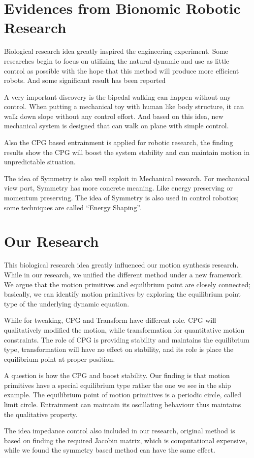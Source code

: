 \section{ Evidences from Bionomic Robotic Research}
Biological research idea greatly inspired the engineering experiment.
Some researches begin to focus on utilizing the natural dynamic and use as little control as possible with the hope that this method will produce more efficient robots. 
And some significant result has been reported
\begin{itemize}
A very important discovery is the bipedal walking can happen without any control\citep{McGeer1990}. 
When putting a mechanical toy with human like body structure, it can walk down slope without any control effort. 
And based on this idea, new mechanical system is designed that can walk on plane with simple control\citep{Collins2005}.

Also the CPG based entrainment is applied for robotic research\citep{Williamson1999a}, the finding results show the CPG will boost the system stability and can maintain motion in unpredictable situation.

The idea of Symmetry is also well exploit in Mechanical research.
For mechanical view port, Symmetry has more concrete meaning.
Like energy preserving or momentum preserving.
The idea of Symmetry is also used in control robotics\citep{spong2005controlled}; some techniques are called “Energy Shaping”.
\end{itemize}

\section{Our Research}
This biological research idea greatly influenced our motion synthesis research.
While in our research, we unified the different method under a new framework.
We argue that the motion primitives and equilibrium point are closely connected; basically, we can identify motion primitives by exploring the equilibrium point type of the underlying dynamic equation. 

While for tweaking, CPG and Transform have different role. 
CPG will qualitatively modified the motion, while transformation for quantitative motion constraints.
The role of CPG is providing stability and maintains the equilibrium type, transformation will have no effect on stability, and its role is place the equilibrium point at proper position.

A question is how the CPG and boost stability. 
Our finding is that motion primitives have a special equilibrium type rather the one we see in the ship example.
The equilibrium point of motion primitives is a periodic circle, called limit circle. 
Entrainment can maintain its oscillating behaviour thus maintains the qualitative property.

The idea impedance control also included in our research, original method is based on finding the required Jacobin matrix, which is computational expensive, while we found the symmetry based method can have the same effect.


